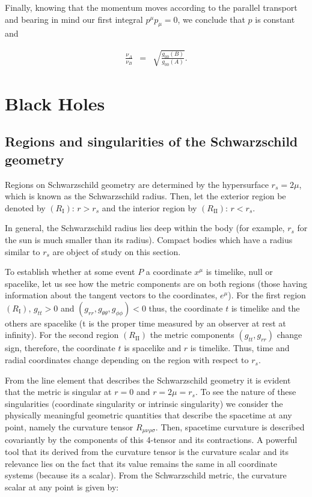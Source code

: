 \documentclass[letterpaper,11pt,onecolumn]{article}
\begin{document}
Finally, knowing that the momentum moves according to the parallel transport and bearing in mind our first integral $p^{\mu}p_{\mu} = 0$, we conclude that $p$ is constant and 

        \begin{eqnarray*}
         \frac{\nu_{A}}{\nu_{B}} &=&  \sqrt{\frac{g_{00}(B)}{g_{00}(A)}}.
    \end{eqnarray*}



\section{Black Holes}

\subsection{Regions and singularities of the Schwarzschild geometry}

Regions on Schwarzschild geometry are determined by the hypersurface $r_s=2\mu$, which is known as the Schwarzschild radius. Then, let the exterior region be denoted by $(R_{\mathrm{I}})$: $r>r_s$ and the interior region by $(R_{\mathrm{II}})$: $r<r_s$.

In general, the Schwarzschild radius lies deep within the body (for example, $r_s$ for the sun is much smaller than its radius). Compact bodies which have a radius similar to $r_s$ are object of study on this section.

To establish whether at some event $P$ a coordinate $x^\mu$ is timelike, null or spacelike, let us see how the metric components are on both regions (those having information about the tangent vectors to the coordinates, $e^\mu$). For the first region $(R_{\mathrm{I}})$, $g_{tt}>0$ and $(g_{rr}, g_{\theta \theta}, g_{\phi \phi})<0$  thus, the coordinate $t$ is timelike and the others are spacelike (t is the proper time measured by an observer at rest at infinity).  For the second region $(R_{\mathrm{II}})$ the metric components $(g_{tt}, g_{rr})$ change sign, therefore, the coordinate $t$ is spacelike and $r$ is timelike. Thus, time and radial coordinates change depending on the region with respect to $r_s$.

From the line element that describes the Schwarzschild geometry it is evident that the metric is singular at $r=0$ and $r=2\mu=r_s$. To see the nature of these singularities (coordinate singularity or intrinsic singularity) we consider the physically meaningful geometric quantities that describe the spacetime at any point, namely the curvature tensor $R_{\mu\nu\rho\sigma}$. Then, spacetime curvature
is described covariantly by the components of this 4-tensor and its contractions. A powerful tool that its derived from the curvature tensor is the curvature scalar and its relevance lies on the fact that its value remains the same in all coordinate systems (because its a scalar). From the Schwarzschild metric, the curvature scalar at any point is given by:
\end{document}
